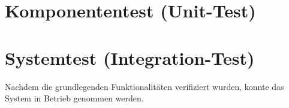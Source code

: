 \section{Komponententest (Unit-Test)}


\section{Systemtest (Integration-Test)}\label{sec:inttest}
Nachdem die grundlegenden Funktionalitäten verifiziert wurden, konnte das System in Betrieb genommen werden.